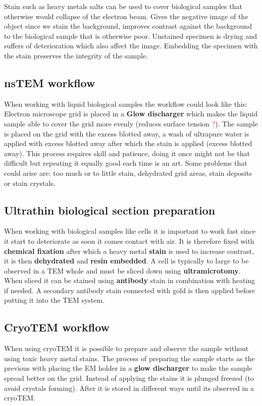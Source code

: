 	Stain such as heavy metals salts can be used to cover biological samples that otherwise would collapse of the electron beam. Gives the negative image of the object since we stain the background, improves contrast against the background to the biological sample that is otherwise poor. Unstained specimen is drying and suffers of deterioration which also affect the image. Embedding the specimen with the stain preserves the integrity of the sample. 

	\subsection*{nsTEM workflow}
	When working with liquid biological samples the workflow could look like this: Electron microscope grid is placed in a \textbf{Glow discharger} which makes the liquid sample able to cover the grid more evenly (reduces surface tension \textcolor{red}{?}). The sample is placed on the grid with the excess blotted away, a wash of ultrapure water is applied with excess blotted away after which the stain is applied (excess blotted away). This process requires skill and patience, doing it once might not be that difficult but repeating it equally good each time is an art. Some problems that could arise are: too much or to little stain, dehydrated grid areas, stain deposits or stain crystals.

	\subsection*{Ultrathin biological section preparation}
	When working with biological samples like cells it is important to work fast since it start to deteriorate as soon it comes contact with air. It is therefore fixed with \textbf{chemical fixation} after which a heavy metal \textbf{stain} is used to increase contrast, it is then \textbf{dehydrated} and \textbf{resin embedded}. A cell is typically to large to be observed in a TEM whole and must be sliced down using \textbf{ultramicrotomy}. When sliced it can be stained using \textbf{antibody} stain in combination with heating if needed. A secondary antibody stain connected with gold is then applied before putting it into the TEM system. 

	\subsection*{CryoTEM workflow}
	When using cryoTEM it is possible to prepare and observe the sample without using toxic heavy metal stains. The process of preparing the sample starts as the previous with placing the EM holder in a \textbf{glow discharger} to make the sample spread better on the grid. Instead of applying the stains it is plunged freezed (to avoid crystals forming). After it is stored in different ways until its observed in a cryoTEM. 

